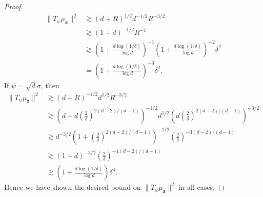 \documentclass{article}
\theoremstyle{definition}
\def\vz{{\bm{z}}}
\begin{document}
\begin{proof}
    \begin{align*}
        \|T_{\psi}\mu_{\vz}\|^2 &\gtrsim (d + R)^{1/2}d^{-1/2}R^{-3/2}\\
        &\gtrsim (1 + d)^{-1/2}R^{-1}\\
        &\gtrsim \left(1 + \frac{d\log(1/\delta) }{\log d} \right)^{-1}\left(1 + \frac{d\log(1/\delta) }{\log d}\right)^{-2} \delta^2\\
        &= \left(1 + \frac{d\log(1/\delta) }{\log d} \right)^{-3} \delta^{2}.
    \end{align*}
    If $\psi = \sqrt{d}\sigma$, then
    \begin{align*}
        \|T_{\psi}\mu_{\vz}\|^2 &\gtrsim (d + R)^{-1/2}d^{1/2}R^{-3/2}\\
        &\gtrsim \left(d + d\left(\frac{2}{\delta} \right)^{2(d - 2)/(d - 1)}  \right)^{-1/2}d^{1/2}\left(d\left(\frac{2}{\delta}\right)^{2(d - 2)/(d - 1)}\right)^{-3/2}\\
        &\gtrsim d^{-3/2}\left(1 + \left(\frac{2}{\delta}\right)^{2(d -2 )/(d - 1)}\right)^{-1/2}\left(\frac{2}{\delta}\right)^{-3(d - 2)/(d - 1) }\\
        &\gtrsim (1 + d)^{-3/2}\left(\frac{2}{\delta}\right)^{-4(d-2)/(d -1 )}\\
        &\gtrsim \left(1 + \frac{d\log(1/\delta) }{\log d}\right) \delta^4.
    \end{align*}
    Hence we have shown the desired bound on $\|T_{\psi}\mu_{\vz}\|^2$ in all cases.
\end{proof}





    
\end{document}
